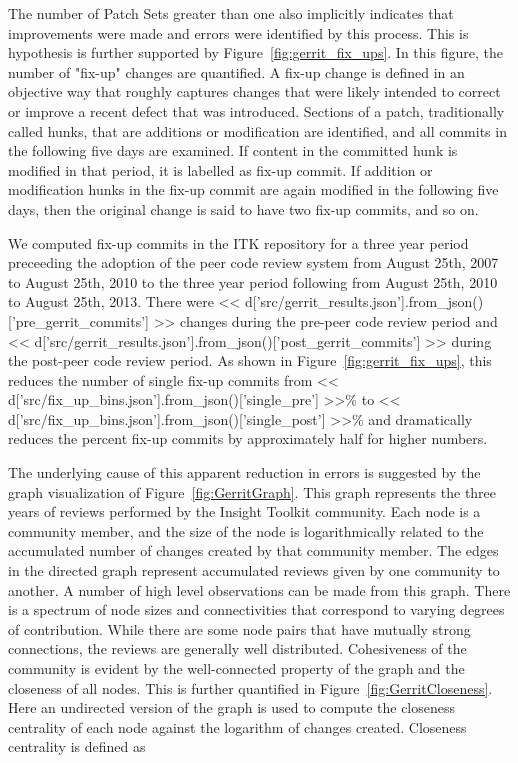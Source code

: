 \documentclass{frontiersENG} %
\begin{document}
The number of Patch Sets greater than one also implicitly indicates that
improvements were made and errors were identified by this process.  This is
hypothesis is further supported by Figure~\ref{fig:gerrit_fix_ups}.  In this
figure, the number of "fix-up" changes are quantified. A fix-up change is
defined in an objective way that roughly captures changes that were likely
intended to correct or improve a recent defect that was introduced.  Sections
of a patch, traditionally called hunks, that are additions or modification are
identified, and all commits in the following five days are examined.  If
content in the committed hunk is modified in that period, it is labelled as
fix-up commit.  If addition or modification hunks in the fix-up commit are again
modified in the following five days, then the original change is said to have
two fix-up commits, and so on.

We computed fix-up commits in the ITK repository for a three year period
preceeding the adoption of the peer code review system from August 25th, 2007
to August 25th, 2010 to the three year period following from August 25th, 2010
to August 25th, 2013.  There were
<< d['src/gerrit_results.json'].from_json()['pre_gerrit_commits'] >>
changes during the pre-peer code review period and
<< d['src/gerrit_results.json'].from_json()['post_gerrit_commits'] >>
during the post-peer code review period.  As shown in
Figure~\ref{fig:gerrit_fix_ups}, this reduces the number of
single fix-up commits from <<
d['src/fix_up_bins.json'].from_json()['single_pre'] >>\%
to << d['src/fix_up_bins.json'].from_json()['single_post'] >>\% and
dramatically reduces the percent fix-up commits by approximately half for
higher numbers.

The underlying cause of this apparent reduction in errors is suggested by the
graph visualization of Figure~\ref{fig:GerritGraph}. This graph represents
the three years of reviews performed by the Insight Toolkit community. Each
node is a community member, and the size of the node is logarithmically
related to the accumulated number of changes created by that community member.
The edges in the directed graph represent accumulated reviews given by one
community to another. A number of high level observations can be made from
this graph.  There is a spectrum of node sizes and connectivities that
correspond to varying degrees of contribution. While there are some node pairs
that have mutually strong connections, the reviews are generally well
distributed.  Cohesiveness of the community is evident by the well-connected
property of the graph and the closeness of all nodes.  This is further
quantified in Figure~\ref{fig:GerritCloseness}.  Here an undirected version
of the graph is used to compute the closeness centrality of each node against
the logarithm of changes created.  Closeness centrality is defined
as \cite{Freeman1979}
\end{document}
